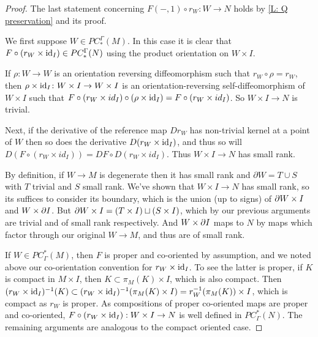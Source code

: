 \begin{proof}
The last statement concerning $F(-,1)\circ r_W: W \to N$ holds by \cref{L: Q preservation} and its proof.

We first suppose $W \in PC_*^\Gamma(M)$. In this case it is clear that $F\circ (r_W \times \mathrm{id}_I) \in PC_*^\Gamma(N)$ using the product orientation on $W \times I$.

	If $\rho \colon W \to W$ is an orientation reversing diffeomorphism such that $r_W\circ \rho = r_W$, then
	 $\rho \times \mathrm{id}_I \colon W \times I \to W \times I$ is an orientation-reversing self-diffeomorphism of $W \times I$ such that $F\circ(r_W \times id_I)\circ (\rho \times \mathrm{id}_I) = F\circ(r_W \times id_I)$.
	 So $W \times I \to N$ is trivial.

	Next, if the derivative of the reference map $Dr_W$ has non-trivial kernel at a point of $W$ then so does
	 the derivative $D(r_W \times \mathrm{id}_I)$, and thus so
	 will $D(F\circ (r_W \times id_I)) = DF\circ D(r_W \times id_I)$. Thus $W \times I \to N$ has small rank.

	By definition, if $W \to M$ is degenerate then it has small rank and $\partial W = T \cup S$ with $T$ trivial and $S$ small rank.
	We've shown that $W \times I \to N$ has small rank, so its suffices to consider its boundary,
	which is the union (up to signs) of $\partial W \times I$ and $W \times \partial I$. But $\partial W \times I = (T \times I) \sqcup (S \times I)$, which by our previous
	arguments are trivial and of small rank respectively. And $W \times \partial I$ maps to $N$ by maps which factor through our original $W \to M$,
	and thus are of small rank.


If $W \in PC^*_\Gamma(M)$, then $F$ is proper and co-oriented by assumption, and we noted above our co-orientation convention for $r_W \times \mathrm{id}_I$. To see the latter is proper, if $K$ is compact in $M \times I$, then $K \subset \pi_M(K) \times I$, which is also compact. Then $(r_W \times \mathrm{id}_I)^{-1}(K) \subset (r_W \times \mathrm{id}_I)^{-1}(\pi_M(K) \times I) = r_W^{-1}(\pi_M(K)) \times I$, which is compact as $r_W$ is proper.
As compositions of proper co-oriented maps are proper and co-oriented, $F\circ (r_W \times \mathrm{id}_I):W \times I \to N$ is well defined in $PC^*_\Gamma(N)$. The remaining arguments are analogous to the compact oriented case.
\end{proof}

